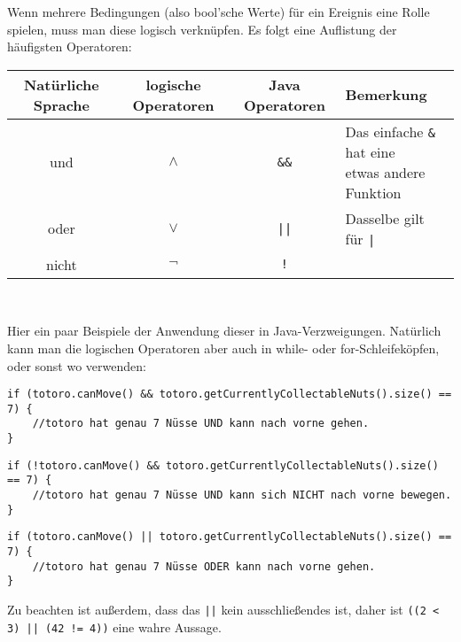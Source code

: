 	\begin{Infobox}[Logische Operatoren]
	
	Wenn mehrere Bedingungen (also bool'sche Werte) für ein Ereignis eine Rolle spielen, muss man diese logisch verknüpfen.
	Es folgt eine Auflistung der häufigsten Operatoren:

	\begin{center}
		\begin{tabular}{ c | c | c | l}
			Natürliche Sprache & logische Operatoren & Java Operatoren & Bemerkung \\
			\hline
			und  & $\wedge$ & \texttt{\&\&} & \minibox{Das einfache \texttt{\&} hat eine\\etwas andere Funktion} \\
			oder & $\vee$ & \texttt{||} & Dasselbe gilt für \texttt{|} \\
			nicht & $\neg$ & \texttt{!} &\\
		\end{tabular}\\
	\end{center}

	Hier ein paar Beispiele der Anwendung dieser in Java-Verzweigungen.
	Natürlich kann man die logischen Operatoren aber auch in while- oder for-Schleifeköpfen, oder sonst wo verwenden:

	\begin{lstlisting}[numbers=none]
if (totoro.canMove() && totoro.getCurrentlyCollectableNuts().size() == 7) {
	//totoro hat genau 7 Nüsse UND kann nach vorne gehen.
}
	\end{lstlisting}

	\begin{lstlisting}[numbers=none]
if (!totoro.canMove() && totoro.getCurrentlyCollectableNuts().size() == 7) {
	//totoro hat genau 7 Nüsse UND kann sich NICHT nach vorne bewegen.
}
	\end{lstlisting}

	\begin{lstlisting}[numbers=none]
if (totoro.canMove() || totoro.getCurrentlyCollectableNuts().size() == 7) {
	//totoro hat genau 7 Nüsse ODER kann nach vorne gehen.
}
	\end{lstlisting}

	Zu beachten ist außerdem, dass das  \lstinline{||} kein ausschließendes  ist, daher ist \lstinline{((2 < 3) || (42 != 4))} eine wahre Aussage.

\end{Infobox}


